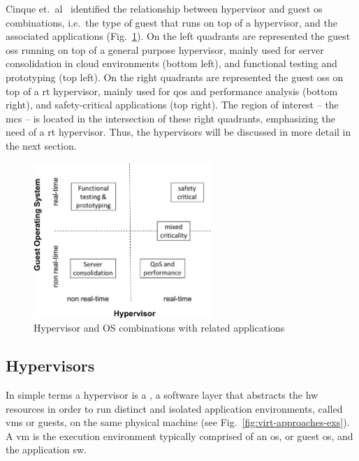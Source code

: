 Cinque et.~al~\cite{cinque2022virtualizing} identified the relationship between hypervisor and guest
\gls{os} combinations, i.e.~the type of guest that runs on top of a hypervisor, and the
associated applications (Fig.~\ref{fig:virt-combos}).
On the left quadrants are represented the guest \glspl{os} running on top of a
general purpose hypervisor, mainly used for server consolidation in cloud
environments (bottom left), and functional testing and prototyping (top left).
On the right quadrants are represented the guest \glspl{os} on top of a \gls{rt}
hypervisor, mainly used for \gls{qos} and performance analysis (bottom right), and
safety-critical applications (top right). The region of interest -- the
\gls{mcs} -- is located in the intersection of these right quadrants,
emphasizing the need of a \gls{rt} hypervisor. Thus, the hypervisors will be
discussed in more detail in the next section.

\begin{figure}[!hbt]
  \centering
  \includegraphics[width=0.6\textwidth]{./img/jpg/virt-combos} 
%   
  \caption[Hypervisor and OS combinations with related applications]{Hypervisor
    and OS combinations with related applications~\cite{cinque2022virtualizing}\footnotemark}%
  \label{fig:virt-combos}
\end{figure}
%
%

\subsection{Hypervisors}%
\label{sec:superv--hyperv}
In simple terms a hypervisor is a , a software layer that
abstracts the \gls{hw} resources in order to run distinct and isolated
application environments, called \glspl{vm} or guests, on the same physical
machine (see Fig.~\ref{fig:virt-approaches-exs}). A \gls{vm} is the execution environment typically comprised of an
\gls{os}, or guest \gls{os}, and the application \gls{sw}.

